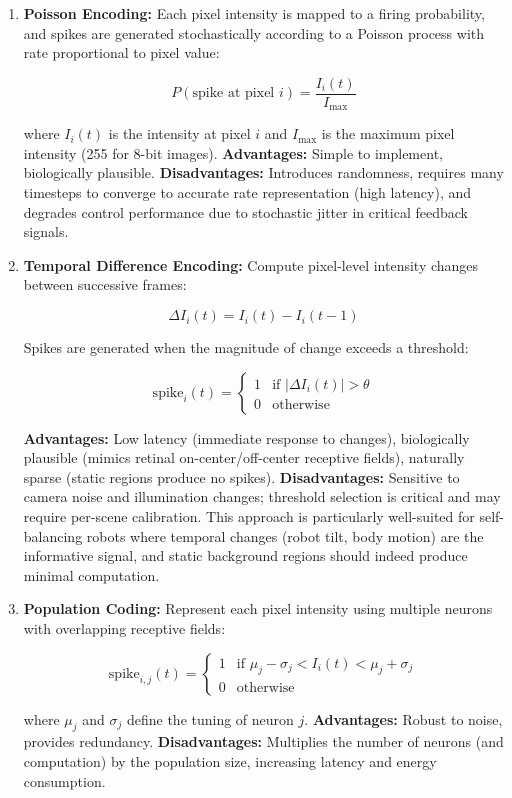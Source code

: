 \begin{enumerate}
    
\item \textbf{Poisson Encoding:} Each pixel intensity is mapped to a firing probability, and spikes are generated stochastically 
according to a Poisson process with rate proportional to pixel value:

$$P(\text{spike at pixel } i) = \frac{I_i(t)}{I_{\max}}$$

where $I_i(t)$ is the intensity at pixel $i$ and $I_{\max}$ is the maximum pixel intensity (255 for 8-bit images). 
\textbf{Advantages:} Simple to implement, biologically plausible. \textbf{Disadvantages:} Introduces randomness, requires 
many timesteps to converge to accurate rate representation (high latency), and degrades control performance due to stochastic 
jitter in critical feedback signals.

    
\item \textbf{Temporal Difference Encoding:} Compute pixel-level intensity changes between successive frames:

$$\Delta I_i(t) = I_i(t) - I_i(t-1)$$

Spikes are generated when the magnitude of change exceeds a threshold:

$$\text{spike}_i(t) = \begin{cases} 1 & \text{if } |\Delta I_i(t)| > \theta \\ 0 & \text{otherwise} \end{cases}$$

\textbf{Advantages:} Low latency (immediate response to changes), biologically plausible (mimics retinal on-center/off-center 
receptive fields), naturally sparse (static regions produce no spikes). \textbf{Disadvantages:} Sensitive to camera noise 
and illumination changes; threshold selection is critical and may require per-scene calibration. This approach is particularly 
well-suited for self-balancing robots where temporal changes (robot tilt, body motion) are the informative signal, and static 
background regions should indeed produce minimal computation.

    
\item \textbf{Population Coding:} Represent each pixel intensity using multiple neurons with overlapping receptive fields:

$$\text{spike}_{i,j}(t) = \begin{cases} 1 & \text{if } \mu_j - \sigma_j < I_i(t) < \mu_j + \sigma_j \\ 0 & \text{otherwise} \end{cases}$$

where $\mu_j$ and $\sigma_j$ define the tuning of neuron $j$. \textbf{Advantages:} Robust to noise, provides redundancy. 
\textbf{Disadvantages:} Multiplies the number of neurons (and computation) by the population size, increasing latency and 
energy consumption.

\end{enumerate}

